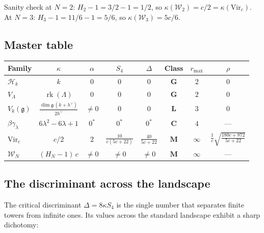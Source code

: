 \documentclass[11pt,reqno]{amsart}
\theoremstyle{definition}
\theoremstyle{remark}
\newcommand{\cH}{\mathcal{H}}
\newcommand{\cW}{\mathcal{W}}
\newcommand{\fg}{\mathfrak{g}}
\newcommand{\Vir}{\mathrm{Vir}}
\DeclareMathOperator{\rk}{rk}
\numberwithin{equation}{section}
\begin{document}
\noindent Sanity check at $N = 2$:
$H_2 - 1 = 3/2 - 1 = 1/2$, so
$\kappa(\cW_2) = c/2 = \kappa(\Vir_c)$.
At $N = 3$: $H_3 - 1 = 11/6 - 1 = 5/6$, so
$\kappa(\cW_3) = 5c/6$.


\subsection{Master table}\label{subsec:master-table}

\begin{center}
\renewcommand{\arraystretch}{1.4}
\small
\begin{tabular}{lccccccc}
\toprule
Family & $\kappa$ & $\alpha$ & $S_4$ & $\Delta$
 & Class & $r_{\max}$ & $\rho$ \\
\midrule
$\cH_k$
 & $k$ & $0$ & $0$ & $0$
 & $\mathbf{G}$ & $2$ & $0$ \\[2pt]
$V_\Lambda$
 & $\rk(\Lambda)$ & $0$ & $0$ & $0$
 & $\mathbf{G}$ & $2$ & $0$ \\[2pt]
\addlinespace
$V_k(\fg)$
 & $\frac{\dim\fg\,(k{+}h^\vee)}{2h^\vee}$
 & $\ne 0$ & $0$ & $0$
 & $\mathbf{L}$ & $3$ & $0$ \\[2pt]
\addlinespace
$\beta\gamma_\lambda$
 & $6\lambda^2{-}6\lambda{+}1$
 & $0^*$ & $0^*$ & $0^*$
 & $\mathbf{C}$ & $4$ & --- \\[2pt]
\addlinespace
$\Vir_c$
 & $c/2$ & $2$
 & $\frac{10}{c(5c{+}22)}$
 & $\frac{40}{5c{+}22}$
 & $\mathbf{M}$ & $\infty$
 & $\frac{1}{c}\!\sqrt{\frac{180c{+}872}{5c{+}22}}$
 \\[4pt]
$\cW_N$
 & $(H_N{-}1)\,c$
 & $\ne 0$ & $\ne 0$ & $\ne 0$
 & $\mathbf{M}$ & $\infty$ & --- \\
\bottomrule
\end{tabular}
\end{center}



\subsection{The discriminant across the
landscape}\label{subsec:disc-landscape}

The critical discriminant $\Delta = 8\kappa S_4$ is the
single number that separates finite towers from infinite
ones. Its values across the standard landscape exhibit a
sharp dichotomy:
\end{document}
